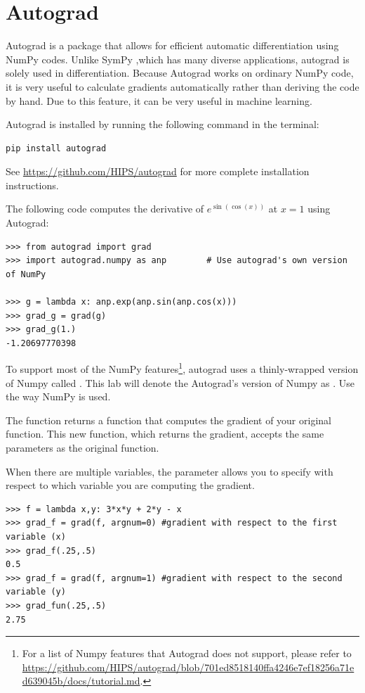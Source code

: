 \section*{Autograd}%

Autograd is a package that allows for efficient automatic differentiation using NumPy codes.
Unlike SymPy ,which has many diverse applications, autograd is solely used in differentiation.
Because Autograd works on ordinary NumPy code, it is very useful to calculate gradients automatically rather than deriving the code by hand. Due to this feature, it can be very useful in machine learning.

Autograd is installed by running the following command in the terminal:
\begin{lstlisting}
pip install autograd
\end{lstlisting}
See \url{https://github.com/HIPS/autograd} for more complete installation instructions.

The following code computes the derivative of $e^{\sin\left(\cos\left(x\right)\right)}$ at $x=1$ using Autograd:
\begin{lstlisting}
>>> from autograd import grad
>>> import autograd.numpy as anp        # Use autograd's own version of NumPy

>>> g = lambda x: anp.exp(anp.sin(anp.cos(x)))
>>> grad_g = grad(g)
>>> grad_g(1.)
-1.20697770398
\end{lstlisting}
To support most of the NumPy features\footnote{For a list of Numpy features that Autograd does not support, please refer to \url{https://github.com/HIPS/autograd/blob/701ed8518140ffa4246e7ef18256a71ed639045b/docs/tutorial.md}.}, autograd uses a thinly-wrapped version of Numpy called .
This lab will denote the Autograd's version of Numpy as . Use  the way NumPy is used.

The function  returns a function that computes the gradient of your original function.
This new function, which returns the gradient, accepts the same parameters as the original function.

When there are multiple variables, the parameter  allows you to specify with respect to which variable you are computing the gradient.
\begin{lstlisting}
>>> f = lambda x,y: 3*x*y + 2*y - x
>>> grad_f = grad(f, argnum=0) #gradient with respect to the first variable (x)
>>> grad_f(.25,.5)
0.5
>>> grad_f = grad(f, argnum=1) #gradient with respect to the second variable (y)
>>> grad_fun(.25,.5)
2.75
\end{lstlisting}


